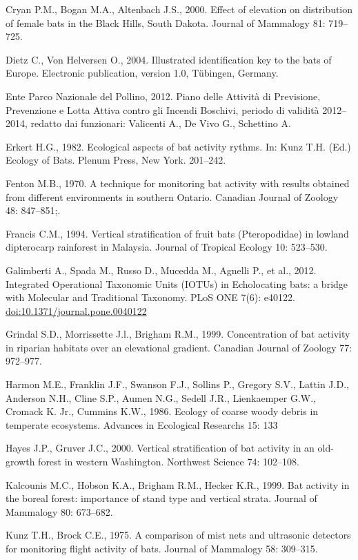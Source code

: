 \begin{multicols}{2}
\begin{small}
Cryan P.M., Bogan M.A., Altenbach J.S., 2000. Effect of elevation on distribution of female bats in the Black Hills, South Dakota. Journal of Mammalogy 81: 719--725.

Dietz C., Von Helversen O., 2004. Illustrated identification key to the bats of Europe. Electronic publication, version 1.0, Tübingen, Germany.

Ente Parco Nazionale del Pollino, 2012. Piano delle Attività di Previsione, Prevenzione e Lotta Attiva contro gli Incendi Boschivi, periodo di validità 2012--2014, redatto dai funzionari: Valicenti A., De Vivo G., Schettino A.

Erkert H.G., 1982. Ecological aspects of bat activity rythms. In: Kunz T.H. (Ed.) Ecology of Bats. Plenum Press, New York. 201--242.

Fenton M.B., 1970. A  technique  for monitoring bat activity with results obtained from different environments in southern Ontario. Canadian Journal of Zoology 48: 847--851;.

Francis C.M., 1994. Vertical stratification of fruit bats (Pteropodidae) in lowland dipterocarp rainforest in Malaysia. Journal of Tropical Ecology 10: 523--530.

Galimberti A., Spada M., Russo D., Mucedda M., Agnelli P., et al., 2012. Integrated Operational Taxonomic Units (IOTUs) in Echolocating bats: a bridge with Molecular  and Traditional Taxonomy. PLoS ONE  7(6): e40122. \url{doi:10.1371/journal.pone.0040122}
  
Grindal S.D., Morrissette J.l., Brigham R.M., 1999. Concentration of bat activity in riparian habitats over an elevational gradient. Canadian Journal of Zoology 77: 972--977.

Harmon M.E., Franklin J.F., Swanson F.J., Sollins P., Gregory S.V., Lattin J.D., Anderson N.H., Cline S.P., Aumen N.G., Sedell J.R., Lienkaemper G.W., Cromack K. Jr., Cummins K.W., 1986. Ecology of coarse woody debris in temperate ecosystems. Advances in Ecological  Researchs 15: 133

Hayes J.P., Gruver J.C., 2000. Vertical stratification of bat activity in an old-growth forest in western Washington. Northwest Science 74: 102--108.

Kalcounis M.C., Hobson K.A., Brigham R.M., Hecker K.R., 1999. Bat activity in the boreal forest: importance of stand type and vertical strata. Journal of Mammalogy 80: 673--682.

Kunz T.H., Brock C.E., 1975. A comparison of mist nets and ultrasonic detectors for monitoring flight activity of bats. Journal of Mammalogy 58: 309--315.


\end{small}
\end{multicols}
